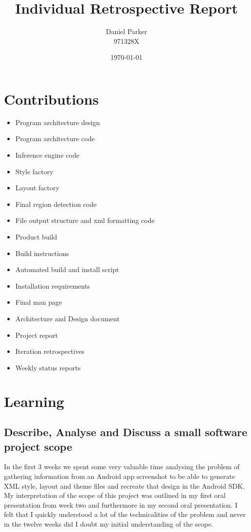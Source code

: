\documentclass{article}
\title{Individual Retrospective Report}
\author{Daniel Parker \\ 971328X}
\date{\today}
\begin{document}
\maketitle

\section{Contributions}
\begin{itemize}
	\item{Program architecture design}
	\item{Program architecture code}
	\item{Inference engine code}
	\item{Style factory}
	\item{Layout factory}
	\item{Final region detection code}
	\item{File output structure and xml formatting code}
	\item{Product build}
	\item{Build instructions}
	\item{Automated build and install script}
	\item{Installation requirements}
	\item{Final man page}
	\item{Architecture and Design document}
	\item{Project report}
	\item{Iteration retrospectives}
	\item{Weekly status reports}
\end{itemize}

\maketitle
\section{Learning}
\subsection{Describe, Analyse and Discuss a small software project scope}
In the first 3 weeks we spent some very valuable time analysing the problem of gathering information from an Android app screenshot to be able to generate XML style, layout and theme files and recreate that design in the Android SDK. My interpretation of the scope of this project was outlined in my first oral presentation from week two and furthermore in my second oral presentation. I felt that I quickly understood a lot of the technicalities of the problem and never in the twelve weeks did I doubt my initial understanding of the scope.
\end{document}
